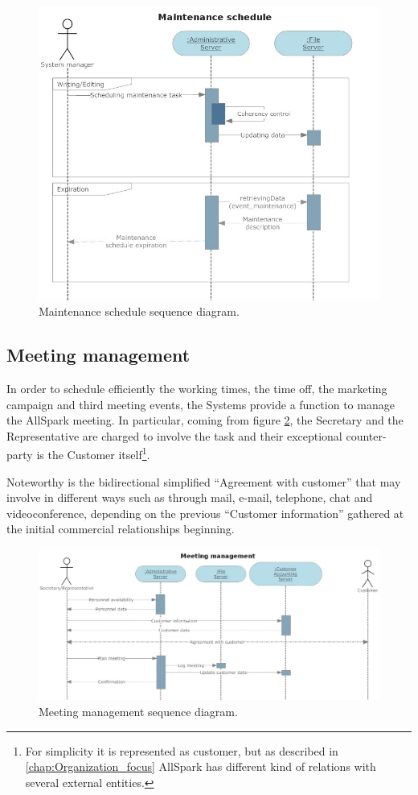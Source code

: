 \begin{figure}[H]
\begin{centering}
\includegraphics[scale=0.50]{assign3/sdraw/imgs/maintenance.jpg}
\caption{Maintenance schedule sequence diagram.}
\label{3img:[sequence]maintenance}
\end{centering}
\end{figure}


\subsection{Meeting management}
In order to schedule efficiently the working times, the time off, the marketing campaign and third meeting events, the Systems provide a function to manage the AllSpark meeting. In particular, coming from figure \ref{3img:[sequence]meeting}, the Secretary and the Representative are charged to involve the task and their exceptional counter-party is the Customer itself\footnote{For simplicity it is represented as customer, but as described in \ref{chap:Organization_focus} AllSpark has different kind of relations with several external entities.}.

Noteworthy is the bidirectional simplified ``Agreement with customer'' that may involve in different ways such as through mail, e-mail, telephone, chat and videoconference, depending on the previous ``Customer information'' gathered at the initial commercial relationships beginning.

\begin{figure}[H]
\begin{centering}
\includegraphics[scale=0.35]{assign3/sdraw/imgs/meeting.jpg}
\caption{Meeting management sequence diagram.}
\label{3img:[sequence]meeting}
\end{centering}
\end{figure}
